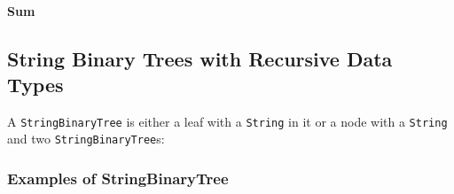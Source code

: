 \hypertarget{sum}{%
\paragraph{Sum}\label{sum}}

\begin{Shaded}
\begin{Highlighting}[]
  \OtherTok{{-}\textgreater{}} 

 \OtherTok{=} 
\OtherTok{=}\OperatorTok{+}
\end{Highlighting}
\end{Shaded}

\hypertarget{string-binary-trees-with-recursive-data-types}{%
\subsection{String Binary Trees with Recursive Data
Types}\label{string-binary-trees-with-recursive-data-types}}

A \texttt{StringBinaryTree} is either a leaf with a \texttt{String} in
it or a node with a \texttt{String} and two \texttt{StringBinaryTree}s:

\begin{Shaded}
\begin{Highlighting}[]
 
  \OtherTok{=}  
  \OperatorTok{|}    
  \NormalTok{ (}\NormalTok{)}
\end{Highlighting}
\end{Shaded}

\hypertarget{examples-of-stringbinarytree}{%
\subsubsection{Examples of
StringBinaryTree}\label{examples-of-stringbinarytree}}

\begin{Shaded}
\begin{Highlighting}[]
\OtherTok{=}  
\OtherTok{=}  
\OtherTok{=}  
\OtherTok{=}  \NormalTok{ (} \NormalTok{) (} \NormalTok{)}
\OtherTok{=}  
\OtherTok{=}  
\OtherTok{=}  
\end{Highlighting}
\end{Shaded}

